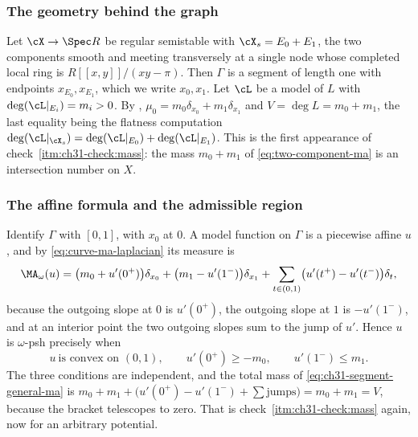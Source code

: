 \subsubsection*{The geometry behind the graph}

Let \(\cX\to\Spec R\) be regular semistable with
\(\cX_s=E_0+E_1\), the two components smooth and meeting transversely at a
single node whose completed local ring is \(R[[x,y]]/(xy-\pi)\).  Then
\(\Gamma\) is a segment of length one with endpoints \(x_{E_0},x_{E_1}\),
which we write \(x_0,x_1\).  Let \(\cL\) be a model of \(L\) with
\(\deg(\cL|_{E_i})=m_i>0\).  By ,
\(\mu_0=m_0\delta_{x_0}+m_1\delta_{x_1}\) and
\(V=\deg L=m_0+m_1\), the last equality being the flatness computation
\(\deg(\cL|_{\cX_s})=\deg(\cL|_{E_0})+\deg(\cL|_{E_1})\).  This is the
first appearance of check~\cref{itm:ch31-check:mass}: the mass \(m_0+m_1\)
of \eqref{eq:two-component-ma} is an intersection number on \(X\).

\subsubsection*{The affine formula and the admissible region}

Identify \(\Gamma\) with \([0,1]\), with \(x_0\) at \(0\).  A model function
on \(\Gamma\) is a piecewise affine \(u\), and by
\eqref{eq:curve-ma-laplacian} its measure is
\begin{equation}
\label{eq:ch31-segment-general-ma}
 \MA_\omega(u)
 =\bigl(m_0+u'(0^+)\bigr)\delta_{x_0}
  +\bigl(m_1-u'(1^-)\bigr)\delta_{x_1}
  +\sum_{t\in(0,1)}\bigl(u'(t^+)-u'(t^-)\bigr)\delta_t ,
\end{equation}
because the outgoing slope at \(0\) is \(u'(0^+)\), the outgoing slope at
\(1\) is \(-u'(1^-)\), and at an interior point the two outgoing slopes sum
to the jump of \(u'\).  Hence \(u\) is \(\omega\)-psh precisely when
\begin{equation}
\label{eq:ch31-segment-psh}
 u\ \text{is convex on }(0,1),
 \qquad u'(0^+)\geq-m_0,
 \qquad u'(1^-)\leq m_1 .
\end{equation}
The three conditions are independent, and the total mass of
\eqref{eq:ch31-segment-general-ma} is
\(m_0+m_1+\bigl(u'(0^+)-u'(1^-)+\sum\text{jumps}\bigr)=m_0+m_1=V\), because
the bracket telescopes to zero.  That is
check~\cref{itm:ch31-check:mass} again, now for an arbitrary potential.

